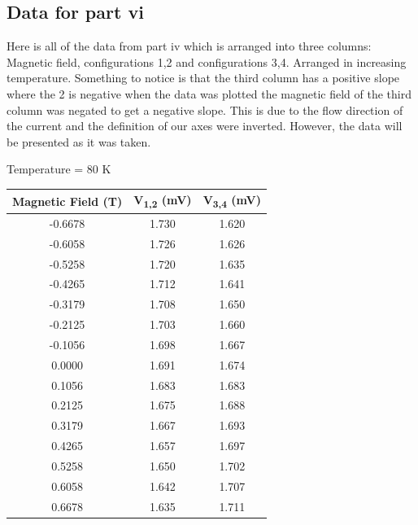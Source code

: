 \documentclass[twocolumn]{article}
\begin{document}
\subsection{Data for part vi}
Here is all of the data from part iv which is arranged into three columns: 
Magnetic field, configurations 1,2 and configurations 3,4. Arranged in 
increasing temperature. Something to notice is that the third column has a 
positive slope where the 2 is negative when the data was plotted the magnetic 
field of the third column was negated to get a negative slope. This is due to 
the flow direction of the current and the definition of our axes were inverted. 
However, the data will be presented as it was taken.
\begin{minipage}{\linewidth}
\Centering
Temperature = 80 K
\begin{tabular}{|c|c|c|}
\hline
Magnetic Field (T) & V\textsubscript{1,2} (mV) & V\textsubscript{3,4} (mV) \\ \hline
-0.6678 & 1.730 & 1.620 \\ \hline
-0.6058 & 1.726 & 1.626 \\ \hline
-0.5258 & 1.720 & 1.635 \\ \hline
-0.4265 & 1.712 & 1.641 \\ \hline
-0.3179 & 1.708 & 1.650 \\ \hline
-0.2125 & 1.703 & 1.660 \\ \hline
-0.1056 & 1.698 & 1.667 \\ \hline
0.0000 & 1.691 & 1.674 \\ \hline
0.1056 & 1.683 & 1.683 \\ \hline
0.2125 & 1.675 & 1.688 \\ \hline
0.3179 & 1.667 & 1.693 \\ \hline
0.4265 & 1.657 & 1.697 \\ \hline
0.5258 & 1.650 & 1.702 \\ \hline
0.6058 & 1.642 & 1.707 \\ \hline
0.6678 & 1.635 & 1.711 \\ \hline
\end{tabular}
\end{minipage}
\end{document}
